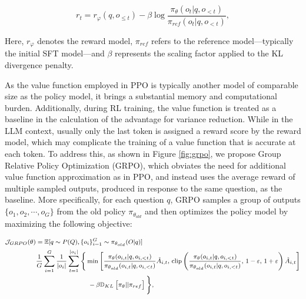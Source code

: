\begin{itemize}[topsep=0pt]
\begin{itemize}[topsep=0pt]
\begin{equation}
    r_{t} = r_\varphi(q, o_{\le t}) - \beta \log\frac{\pi_{\theta}(o_{t}|q, o_{<t})}{\pi_{ref}(o_{t}|q, o_{<t})},
\label{eq:PPO-reward}
\end{equation}

Here, $r_\varphi$ denotes the reward model, $\pi_{ref}$ refers to the reference model—typically the initial SFT model—and $\beta$ represents the scaling factor applied to the KL divergence penalty.

As the value function employed in PPO is typically another model of comparable size as the policy model, it brings a substantial memory and computational burden. Additionally, during RL training, the value function is treated as a baseline in the calculation of the advantage for variance reduction. While in the LLM context, usually only the last token is assigned a reward score by the reward model, which may complicate the training of a value function that is accurate at each token. To address this, as shown in Figure \ref{fig:grpo}, we propose Group Relative Policy Optimization (GRPO), which obviates the need for additional value function approximation as in PPO, and instead uses the average reward of multiple sampled outputs, produced in response to the same question, as the baseline. More specifically, for each question $q$, GRPO samples a group of outputs $\{o_1, o_2, \cdots, o_G\}$  from the old policy  $\pi_{\theta_{old}}$  and then optimizes the policy model by maximizing the following objective:

\begin{equation}
\footnotesize
\begin{split}
    \mathcal{J}_{GRPO}(\theta) &= \mathbb{E}{[q \sim P(Q), \{o_i\}_{i=1}^G \sim \pi_{\theta_{old}}(O|q)]}  \\
    & \frac{1}{G}\sum_{i=1}^G \frac{1}{|o_i|} \sum_{t=1}^{|o_i|} \Bigg\{ \min \left[ \frac{\pi_\theta(o_{i,t} | q, o_{i,<t})}{\pi_{\theta_{old}}(o_{i,t} | q, o_{i,<t})} \hat{A}_{i,t},\, \text{clip} \left( \frac{\pi_\theta(o_{i,t} | q, o_{i,<t})}{\pi_{\theta_{old}}(o_{i,t} | q, o_{i,<t})},\, 1 - \varepsilon,\, 1 + \varepsilon \right) \hat{A}_{i,t} \right] \\
    &\hspace{8em} - \beta \mathbb{D}_{KL}\left[\pi_{\theta} || \pi_{ref}\right] \Bigg\},
\end{split}
\label{eq:GRPO-obj}
\end{equation}


\end{itemize}
\end{itemize}
